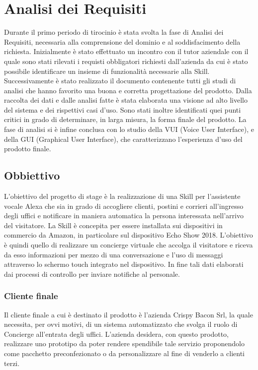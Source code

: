 
\chapter{Analisi dei Requisiti}
\label{cap:processi-metodologie}
Durante il primo periodo di tirocinio è stata svolta la fase di Analisi dei Requisiti, necessaria alla comprensione del dominio e al soddisfacimento della richiesta. Inizialmente è stato effettuato un incontro con il tutor aziendale con il quale sono stati rilevati i requisti obbligatori richiesti dall'azienda da cui è stato possibile identificare un insieme di funzionalità necessarie alla Skill. Successivamente è stato realizzato il documento contenente tutti gli studi di analisi che hanno favorito una buona e corretta progettazione del prodotto. Dalla raccolta dei dati e dalle analisi fatte è stata elaborata una visione ad alto livello del sistema e dei rispettivi casi d’uso. Sono stati inoltre identificati quei punti critici in grado di determinare, in larga misura, la forma finale del prodotto.
La fase di analisi si è infine conclusa con lo studio della VUI (Voice User Interface), e della GUI (Graphical User Interface), che caratterizzano l'esperienza d'uso del prodotto finale. 

\section{Obbiettivo}
L’obiettivo del progetto di stage è la realizzazione di una Skill per l’assistente vocale Alexa che sia in grado di accogliere clienti, postini e corrieri all'ingresso degli uffici e notificare in maniera automatica la persona interessata nell'arrivo del visitatore. La Skill è concepita per essere installata sui dispositivi in commercio da Amazon, in particolare sul dispositivo Echo Show 2018. L’obiettivo è quindi quello di realizzare un concierge virtuale che accolga il visitatore e riceva da esso informazioni per mezzo di una conversazione e l’uso di messaggi attraverso lo schermo touch integrato nel dispositivo. In fine tali dati elaborati dai processi di controllo per inviare notifiche al personale.

\subsection{Cliente finale}
Il cliente finale a cui è destinato il prodotto è l’azienda Crispy Bacon Srl, la quale necessita, per ovvi motivi, di un sistema automatizzato che svolga il ruolo di Concierge all'entrata degli uffici. L’azienda desidera, con questo prodotto, realizzare uno prototipo da poter rendere spendibile tale servizio proponendolo come pacchetto preconfezionato o da personalizzare al fine di venderlo a clienti terzi.

